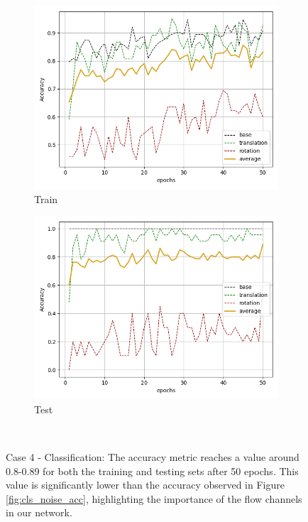 \begin{figure}[H]
    \begin{subfigure}{.48\linewidth}
    \centering
    \includegraphics[scale=0.45]{Img/cls_flow_noise_train_acc.png}
    \caption{Train}
    \end{subfigure}
    \begin{subfigure}{.48\linewidth}
    \centering
    \includegraphics[scale=0.45]{Img/cls_flow_noise_test_acc.png}
    \caption{Test}
    \end{subfigure}\\
    \caption{Case 4 - Classification: The accuracy metric reaches a value around 0.8-0.89 for both the training and testing sets after 50 epochs. This value is significantly lower than the accuracy observed in Figure \ref{fig:cls_noise_acc}, highlighting the importance of the flow channels in our network.}
    \label{fig:cls_flow_noise_acc}
\end{figure}
